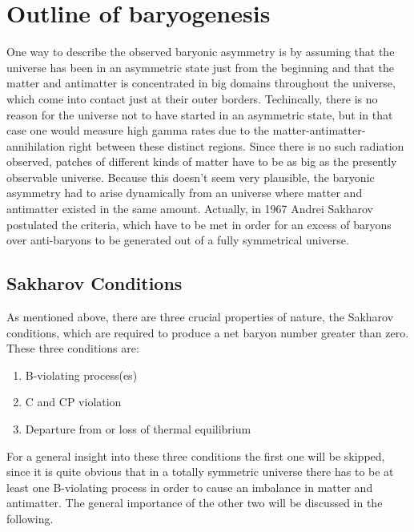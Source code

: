 \chapter{Outline of baryogenesis}
One way to describe the observed baryonic asymmetry is by assuming that the universe has been in an asymmetric state just from the beginning and that the matter and antimatter is concentrated in big domains throughout the universe, which come into contact just at their outer borders. Techincally, there is no reason for the universe not to have started in an asymmetric state, but in that case one would measure high gamma rates due to the matter-antimatter-annihilation right between these distinct regions. \newline\indent \indent
Since there is no such radiation observed, patches of different kinds of matter have to be as big as the presently observable universe. Because this doesn't seem very plausible, the baryonic asymmetry had to arise dynamically from an universe where matter and antimatter existed in the same amount. \newline\indent
Actually, in 1967 Andrei Sakharov postulated the criteria, which have to be met in order for an excess of baryons over anti-baryons to be generated out of a fully symmetrical universe.
\section{Sakharov Conditions}
As mentioned above, there are three crucial properties of nature, the Sakharov conditions, which are required to produce a net baryon number greater than zero. These three conditions are:
\begin{enumerate}
	\item B-violating process(es)
	\item C and CP violation
	\item Departure from or loss of thermal equilibrium
\end{enumerate}
For a general insight into these three conditions the first one will be skipped, since it is quite obvious that in a totally symmetric universe there has to be at least one B-violating process in order to cause an imbalance in matter and antimatter. The general importance of the other two will be discussed in the following.

